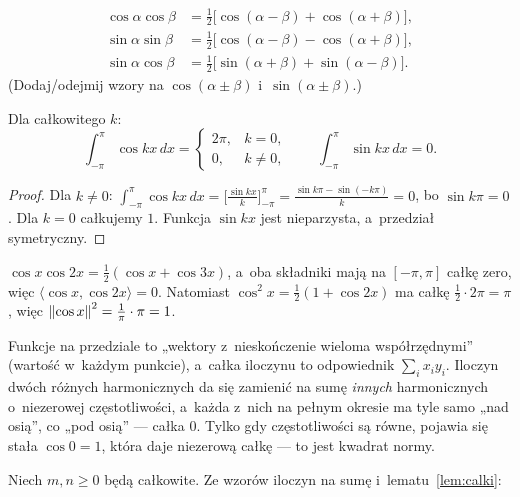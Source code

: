 \documentclass[11pt]{article}
\begin{document}
\begin{teoria}
\begin{fakt}
\begin{align*}
\cos\alpha\cos\beta&=\tfrac12\bigl[\cos(\alpha-\beta)+\cos(\alpha+\beta)\bigr],\\
\sin\alpha\sin\beta&=\tfrac12\bigl[\cos(\alpha-\beta)-\cos(\alpha+\beta)\bigr],\\
\sin\alpha\cos\beta&=\tfrac12\bigl[\sin(\alpha+\beta)+\sin(\alpha-\beta)\bigr].
\end{align*}
(Dodaj/odejmij wzory na $\cos(\alpha\pm\beta)$ i~$\sin(\alpha\pm\beta)$.)
\end{fakt}
\begin{lemat}\label{lem:calki}
Dla całkowitego $k$:
\[
\int_{-\pi}^{\pi}\cos kx\,dx=\begin{cases}2\pi,&k=0,\\0,&k\ne0,\end{cases}
\qquad
\int_{-\pi}^{\pi}\sin kx\,dx=0.
\]
\end{lemat}
\begin{proof}
Dla $k\ne0$: $\int_{-\pi}^{\pi}\cos kx\,dx=\bigl[\frac{\sin kx}k\bigr]_{-\pi}^{\pi}
=\frac{\sin k\pi-\sin(-k\pi)}{k}=0$, bo $\sin k\pi=0$. Dla $k=0$ całkujemy
$1$. Funkcja $\sin kx$ jest nieparzysta, a~przedział symetryczny.
\end{proof}
\end{teoria}

\begin{przyklad}
$\cos x\cos2x=\tfrac12(\cos x+\cos3x)$, a~oba składniki mają na
$[-\pi,\pi]$ całkę zero, więc $\langle\cos x,\cos2x\rangle=0$.
Natomiast $\cos^2x=\tfrac12(1+\cos2x)$ ma całkę $\tfrac12\cdot2\pi=\pi$,
więc $\left\lVert \cos x \right\rVert^2=\tfrac1\pi\cdot\pi=1$.
\end{przyklad}

\begin{intuicja}
Funkcje na przedziale to „wektory z~nieskończenie wieloma
współrzędnymi” (wartość w~każdym punkcie), a~całka iloczynu to
odpowiednik $\sum_ix_iy_i$. Iloczyn dwóch różnych harmonicznych da się
zamienić na sumę \emph{innych} harmonicznych o~niezerowej częstotliwości,
a~każda z~nich na pełnym okresie ma tyle samo „nad osią”, co „pod osią”
--- całka $0$. Tylko gdy częstotliwości są równe, pojawia się stała
$\cos0=1$, która daje niezerową całkę --- to jest kwadrat normy.
\end{intuicja}

\formalnie
Niech $m,n\ge0$ będą całkowite. Ze wzorów iloczyn na sumę
i~lematu~\ref{lem:calki}:
\end{document}
